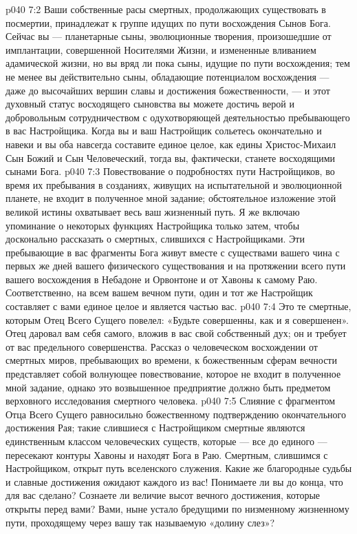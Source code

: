 \vs p040 7:2 Ваши собственные расы смертных, продолжающих существовать в посмертии, принадлежат к группе идущих по пути восхождения Сынов Бога. Сейчас вы --- планетарные сыны, эволюционные творения, произошедшие от имплантации, совершенной Носителями Жизни, и измененные вливанием адамической жизни, но вы вряд ли пока сыны, идущие по пути восхождения; тем не менее вы действительно сыны, обладающие потенциалом восхождения --- даже до высочайших вершин славы и достижения божественности, --- и этот духовный статус восходящего сыновства вы можете достичь верой и добровольным сотрудничеством с одухотворяющей деятельностью пребывающего в вас Настройщика. Когда вы и ваш Настройщик сольетесь окончательно и навеки и вы оба навсегда составите единое целое, как едины Христос\hyp{}Михаил Сын Божий и Сын Человеческий, тогда вы, фактически, станете восходящими сынами Бога.
\vs p040 7:3 Повествование о подробностях пути Настройщиков, во время их пребывания в созданиях, живущих на испытательной и эволюционной планете, не входит в полученное мной задание; обстоятельное изложение этой великой истины охватывает весь ваш жизненный путь. Я же включаю упоминание о некоторых функциях Настройщика только затем, чтобы досконально рассказать о смертных, слившихся с Настройщиками. Эти пребывающие в вас фрагменты Бога живут вместе с существами вашего чина с первых же дней вашего физического существования и на протяжении всего пути вашего восхождения в Небадоне и Орвонтоне и от Хавоны к самому Раю. Соответственно, на всем вашем вечном пути, один и тот же Настройщик составляет с вами единое целое и является частью вас.
\vs p040 7:4 Это те смертные, которым Отец Всего Сущего повелел: «Будьте совершенны, как и я совершенен». Отец даровал вам себя самого, вложив в вас свой собственный дух;  он и требует от вас предельного совершенства. Рассказ о человеческом восхождении от смертных миров, пребывающих во времени, к божественным сферам вечности представляет собой волнующее повествование, которое не входит в полученное мной задание, однако это возвышенное предприятие должно быть предметом верховного исследования смертного человека.
\vs p040 7:5 Слияние с фрагментом Отца Всего Сущего равносильно божественному подтверждению окончательного достижения Рая; такие слившиеся с Настройщиком смертные являются единственным классом человеческих существ, которые --- все до единого --- пересекают контуры Хавоны и находят Бога в Раю. Смертным, слившимся с Настройщиком, открыт путь вселенского служения. Какие же благородные судьбы и славные достижения ожидают каждого из вас! Понимаете ли вы до конца, что для вас сделано? Сознаете ли величие высот вечного достижения, которые открыты перед вами? Вами, ныне устало бредущими по низменному жизненному пути, проходящему через вашу так называемую «долину слез»?
